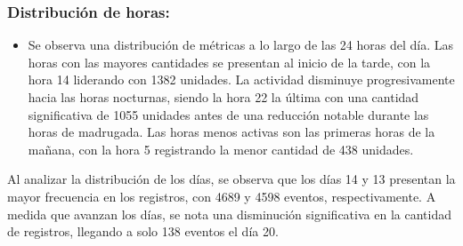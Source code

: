 \subsubsection{Distribución de horas:}
\begin{itemize}
    \item Se observa una distribución de métricas a lo largo de las 24 horas del día. Las horas con las mayores cantidades se presentan al inicio de la tarde, con la hora 14 liderando con 1382 unidades. La actividad disminuye progresivamente hacia las horas nocturnas, siendo la hora 22 la última con una cantidad significativa de 1055 unidades antes de una reducción notable durante las horas de madrugada. Las horas menos activas son las primeras horas de la mañana, con la hora 5 registrando la menor cantidad de 438 unidades.
\end{itemize}

Al analizar la distribución de los días, se observa que los días 14 y 13 presentan la mayor frecuencia en los registros, con 4689 y 4598 eventos, respectivamente. A medida que avanzan los días, se nota una disminución significativa en la cantidad de registros, llegando a solo 138 eventos el día 20.

